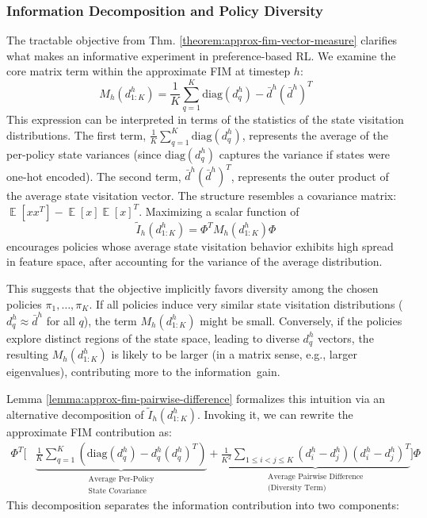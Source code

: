 \documentclass{article}
\DeclareMathOperator*{\E}{\mathbb{E}} %
\begin{document}
\subsubsection{Information Decomposition and Policy Diversity}
\label{subsubsec:info_decomp_appendix}

The tractable objective from Thm. \ref{theorem:approx-fim-vector-measure} clarifies what makes an informative experiment in preference-based RL. We examine the core matrix term within the approximate FIM at timestep $h$:
\[ M_h(d_{1:K}^h) = \frac{1}{K} \sum_{q=1}^K \mathrm{diag}(d^h_q) - \bar{d}^h (\bar{d}^h)^T \]
This expression can be interpreted in terms of the statistics of the state visitation distributions. The first term, $\frac{1}{K} \sum_{q=1}^K \mathrm{diag}(d^h_q)$, represents the average of the per-policy state variances (since $\mathrm{diag}(d^h_q)$ captures the variance if states were one-hot encoded). The second term, $\bar{d}^h (\bar{d}^h)^T$, represents the outer product of the average state visitation vector. The structure resembles a covariance matrix: $\E[xx^T] - \E[x]\E[x]^T$. Maximizing a scalar function of
\[
\tilde{I}_h(d_{1:K}^h) = \Phi^T M_h(d_{1:K}^h) \Phi
\]
encourages policies whose average state visitation behavior exhibits high spread in feature space, after accounting for the variance of the average distribution.

This suggests that the objective implicitly favors diversity among the chosen policies $\pi_1, \dots, \pi_K$. If all policies induce very similar state visitation distributions ($d^h_q \approx \bar{d}^h$ for all $q$), the term $M_h(d_{1:K}^h)$ might be small. Conversely, if the policies explore distinct regions of the state space, leading to diverse $d^h_q$ vectors, the resulting $M_h(d_{1:K}^h)$ is likely to be larger (in a matrix sense, e.g., larger eigenvalues), contributing more to the information~gain.

Lemma \ref{lemma:approx-fim-pairwise-difference} formalizes this intuition via an alternative decomposition of $\tilde{I}_h(d_{1:K}^h)$. Invoking it, we can rewrite the approximate FIM contribution as:
\begin{align*}
\Phi^T \Bigg[
&\underbrace{\frac{1}{K} \sum_{q=1}^K \left( \mathrm{diag}(d^h_q) - d^h_q (d^h_q)^T \right)}_{\substack{\text{Average Per-Policy} \\ \text{State Covariance}}} + \underbrace{\frac{1}{K^2} \sum_{1 \le i < j \le K} (d^h_i - d^h_j)(d^h_i - d^h_j)^T}_{\substack{\text{Average Pairwise Difference} \\ \text{(Diversity Term)}}} \Bigg] \Phi
\end{align*}
This decomposition separates the information contribution into two components:
\end{document}
